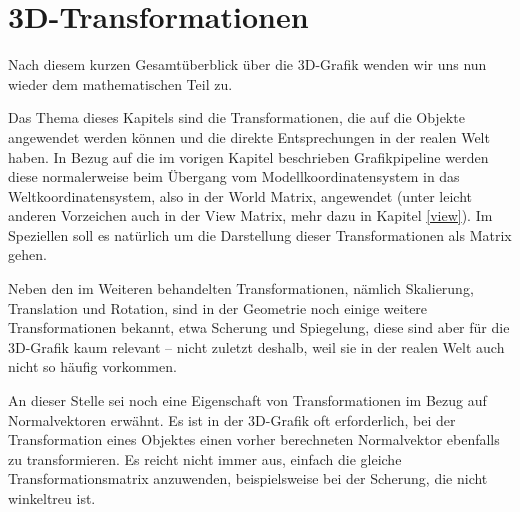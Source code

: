 \chapter{3D-Transformationen}
\label{transformation}

Nach diesem kurzen Gesamtüberblick über die 3D-Grafik wenden wir uns nun wieder dem mathematischen Teil zu.

Das Thema dieses Kapitels sind die Transformationen, die auf die Objekte angewendet werden können und die direkte Entsprechungen in der realen Welt haben. In Bezug auf die im vorigen Kapitel beschrieben Grafikpipeline werden diese normalerweise beim Übergang vom Modellkoordinatensystem in das Weltkoordinatensystem, also in der World Matrix, angewendet (unter leicht anderen Vorzeichen auch in der View Matrix, mehr dazu in Kapitel \ref{view}). Im Speziellen soll es natürlich um die Darstellung dieser Transformationen als Matrix gehen.

Neben den im Weiteren behandelten Transformationen, nämlich Skalierung, Translation und Rotation, sind in der Geometrie noch einige weitere Transformationen bekannt, etwa Scherung und Spiegelung, diese sind aber für die 3D-Grafik kaum relevant -- nicht zuletzt deshalb, weil sie in der realen Welt auch nicht so häufig vorkommen.

An dieser Stelle sei noch eine Eigenschaft von Transformationen im Bezug auf Normalvektoren erwähnt. Es ist in der 3D-Grafik oft erforderlich, bei der Transformation eines Objektes einen vorher berechneten Normalvektor ebenfalls zu transformieren. Es reicht nicht immer aus, einfach die gleiche Transformationsmatrix anzuwenden, beispielsweise bei der Scherung, die nicht winkeltreu ist. 

